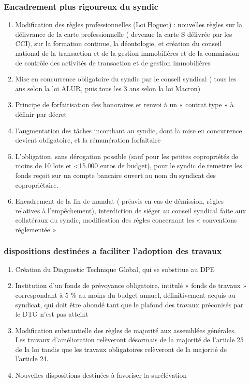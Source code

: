 			\subsubsection{Encadrement plus rigoureux du syndic}
				\begin{enumerate}
					\item Modification des règles professionnelles (Loi Hoguet) : nouvelles règles sur la délivrance de la carte professionnelle ( devenue la carte S délivrée par les CCI), sur la formation continue, la déontologie, et création du conseil national de la transaction et de la gestion immobilières et de la commission de contrôle des activités de transaction et de gestion immobilières
					\item Mise en concurrence obligatoire du syndic par le conseil syndical ( tous les ans selon la loi ALUR, puis tous les 3 ans selon la loi Macron)
					\item Principe de forfaitisation des honoraires et renvoi à un « contrat type » à définir par décret
					\item l'augmentation des tâches incombant au syndic, dont la mise en concurrence devient obligatoire, et la rémunération forfaitaire
					\item L’obligation, sans dérogation possible (sauf pour les petites copropriétés de moins de 10 lots et <15.000 euros de budget), pour le syndic de remettre les fonds reçoit sur un compte bancaire ouvert au nom du syndicat des copropriétaire.
					\item Encadrement de la fin de mandat ( préavis en cas de démission, règles relatives à l’empêchement), interdiction de siéger au conseil syndical faite aux collatéraux du syndic, modification des règles concernant les « conventions réglementée »
				\end{enumerate}
			
			\subsubsection{dispositions destinées a faciliter l’adoption des travaux}
				\begin{enumerate}
					\item Création du Diagnostic Technique Global, qui se substitue au DPE
					\item Institution d’un fonds de prévoyance obligatoire, intitulé « fonds de travaux » correspondant à 5 \% au moins du budget annuel, définitivement acquis au syndicat, qui doit être abondé tant que le plafond des travaux préconisés par le DTG n’est pas atteint
					\item Modification substantielle des règles de majorité aux assemblées générales. Les travaux d'amélioration relèveront désormais de la majorité de l'article 25 de la loi tandis que les travaux obligatoires relèveront de la majorité de l'article 24.
					\item Nouvelles dispositions destinées à favoriser la surélévation
				\end{enumerate}
			
